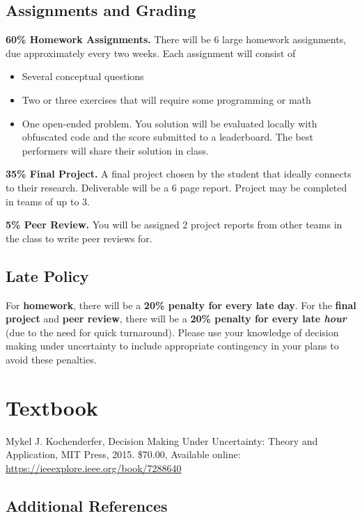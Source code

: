 \documentclass[10pt]{article}
\begin{document}
\begin{samepage}
\section*{Assignments and Grading}

\textbf{60\% Homework Assignments.}
There will be 6 large homework assignments, due approximately every two weeks. Each assignment will consist of
\begin{itemize}[nosep]
    \item Several conceptual questions
    \item Two or three exercises that will require some programming or math
    \item One open-ended problem. You solution will be evaluated locally with obfuscated code and the score submitted to a leaderboard. The best performers will share their solution in class.
\end{itemize}

\textbf{35\% Final Project.}
A final project chosen by the student that ideally connects to their research. Deliverable will be a 6 page report. Project may be completed in teams of up to 3.

\textbf{5\% Peer Review.}
You will be assigned 2 project reports from other teams in the class to write peer reviews for.
\end{samepage}

\subsection*{Late Policy}

For \textbf{homework}, there will be a \textbf{20\% penalty for every late day}. For the \textbf{final project} and \textbf{peer review}, there will be a \textbf{20\% penalty for every late \emph{hour}} (due to the need for quick turnaround). Please use your knowledge of decision making under uncertainty to include appropriate contingency in your plans to avoid these penalties.

\section*{Textbook}

Mykel J. Kochenderfer, Decision Making Under Uncertainty: Theory and Application, MIT Press, 2015. \$70.00, Available online: \url{https://ieeexplore.ieee.org/book/7288640}

\subsection*{Additional References}
\end{document}
